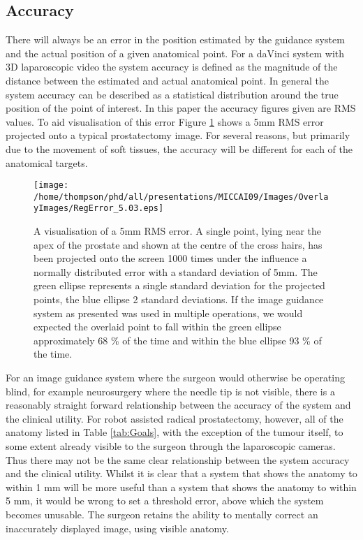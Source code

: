 \documentclass[3p,twocolumn,preprint,10pt]{elsarticle}
\begin{document}
\subsection{Accuracy}
There will always be an error in the position estimated 
by the guidance system and the actual position of a given anatomical point. 
For a daVinci system with 3D laparoscopic video the system accuracy is 
defined as the magnitude of the distance between the estimated and actual 
anatomical point. In general the system accuracy can be
described as a statistical distribution around the true 
position of the point of interest. In this paper the accuracy figures
given are \gls{RMS} values. To aid visualisation of this error 
Figure \ref{fig:SystemError} shows a 5mm \gls{RMS} error projected onto
a typical prostatectomy image.
For several reasons, but primarily due to the 
movement of soft tissues, the accuracy will be different for each of the
anatomical targets. 

\begin{figure}
\begin{center}
\texttt{[image: /home/thompson/phd/all/presentations/MICCAI09/Images/OverlayImages/RegError\_5.03.eps]}
\end{center}
\caption{\label{fig:SystemError}A visualisation of a 5mm RMS error. A single point,
lying near the apex of the prostate and shown at the centre of the cross hairs, has been 
projected onto the screen 1000 times under the influence a normally distributed error
with a standard deviation of 5mm. The green 
ellipse represents a single standard deviation for the projected points, the blue 
ellipse 2 standard deviations. If the image guidance system as presented was used
in multiple operations, we would expected the overlaid point to fall within the green ellipse
approximately 68 \% of the time and within the blue ellipse 93 \% of the time.}
\end{figure}

For an image guidance system where the surgeon would otherwise be operating blind, 
for example neurosurgery where the needle tip is not visible, there is a 
reasonably straight forward relationship between the accuracy of the system and the
clinical utility. 
For robot assisted radical prostatectomy, however, 
all of the anatomy listed in Table \ref{tab:Goals}, with 
the exception of the tumour itself, 
to some extent already visible to the surgeon through the 
laparoscopic cameras. 
Thus there may not be the same clear relationship between the system 
accuracy and the clinical utility.
Whilst it is clear that 
a system that shows the anatomy to within 1 mm will be more useful 
than a system that shows the anatomy to within 5 mm, it would be
wrong to set a threshold error, above which the system 
becomes unusable. The surgeon retains the ability to mentally 
correct an inaccurately displayed image, using visible anatomy.
\end{document}
